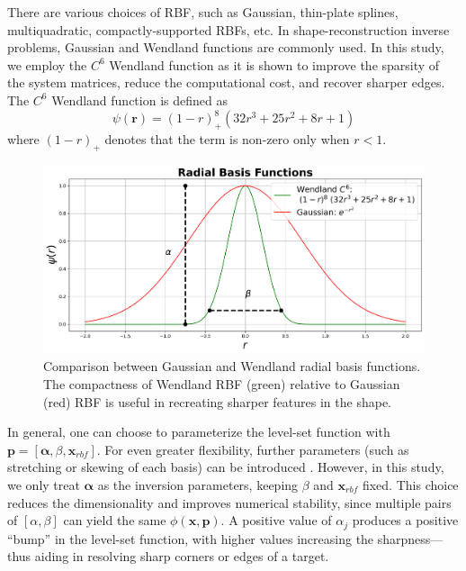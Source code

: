 \documentclass{segabs}
\begin{document}
There are various choices of RBF, such as Gaussian, thin-plate splines, multiquadratic, compactly-supported RBFs, etc. In shape-reconstruction inverse problems, Gaussian and Wendland functions are commonly used. In this study, we employ the $C^6$ Wendland function as it is shown to improve the sparsity of the system matrices, reduce the computational cost, and recover sharper edges\citep{aghasi_parametric_2011}. The $C^6$ Wendland function is defined as \begin{equation}\label{wendland}
\psi(\mathbf{r})  = (1 - r)^8_+ (32r^3 + 25r^2 + 8 r + 1)
\end{equation} where $(1-r)_+$ denotes that the term is non-zero only when $r<1$.

\begin{figure}[h]
    \centering
    \includegraphics[width=\columnwidth]{figures/rbf_func.png}
    \caption{Comparison between Gaussian and Wendland radial basis functions. The compactness of Wendland RBF (green) relative to Gaussian (red) RBF is useful in recreating sharper features in the shape.}
    \label{fig:rbf}
\end{figure}
In general, one can choose to parameterize the level-set function with $\mathbf{p} = [\boldsymbol{\alpha}, \beta, \mathbf{x}_{rbf}]$. For even greater flexibility, further parameters (such as stretching or skewing of each basis) can be introduced \citep{ozsar_parametric_2025}.  However, in this study, we only treat $\boldsymbol{\alpha}$ as the inversion parameters, keeping $\beta$ and $\mathbf{x}_{rbf}$ fixed. This choice reduces the dimensionality and improves numerical stability, since multiple pairs of $[\alpha, \beta]$ can yield the same $\phi(\mathbf{x}, \mathbf{p})$. A positive value of $\alpha_j$ produces a positive “bump” in the level-set function, with higher values increasing the sharpness—thus aiding in resolving sharp corners or edges of a target.
\end{document}
